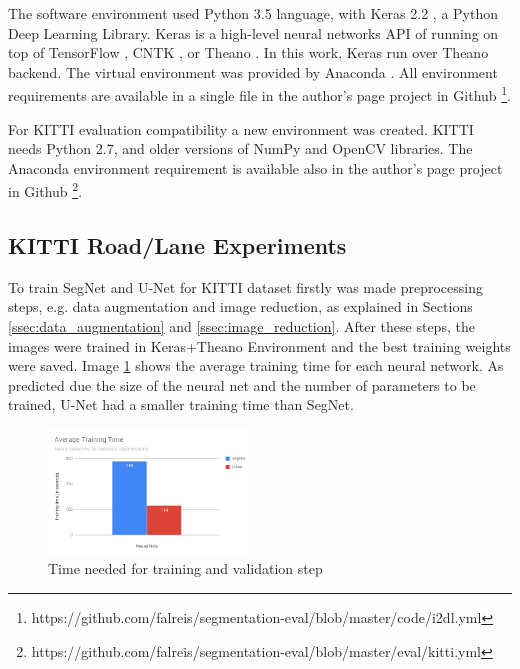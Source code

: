 \documentclass[10pt,twocolumn,letterpaper]{article}
\begin{document}
The software environment used Python 3.5 \cite{PYTHON_WEBSITE} language, with Keras 2.2 \cite{KERAS}, a Python Deep Learning Library. Keras is a high-level neural networks API of running on top of TensorFlow \cite{TENSORFLOW}, CNTK \cite{CNTK}, or Theano \cite{THEANO} \cite{KERAS}. In this work, Keras run over Theano \cite{THEANO} backend. The virtual environment was provided by Anaconda \cite{ANACONDA_WEBSITE}. All environment requirements are available in a single file in the author's page project in Github \footnote{https://github.com/falreis/segmentation-eval/blob/master/code/i2dl.yml}.

For KITTI evaluation compatibility a new environment was created. KITTI needs Python 2.7, and older versions of NumPy and OpenCV libraries. The Anaconda environment requirement is available also in the author's page project in Github \footnote{https://github.com/falreis/segmentation-eval/blob/master/eval/kitti.yml}.

\subsection{KITTI Road/Lane Experiments} \label{ssec:kitti_experiments}

To train SegNet and U-Net for KITTI dataset firstly was made preprocessing steps, e.g. data augmentation and image reduction, as explained in Sections \ref{ssec:data_augmentation} and \ref{ssec:image_reduction}. After these steps, the images were trained in Keras+Theano Environment and the best training weights were saved. Image \ref{fig:training_time} shows the average training time for each neural network. As predicted due the size of the neural net and the number of parameters to be trained, U-Net had a smaller training time than SegNet.

\begin{figure}[ht]
  \centering
  \includegraphics[width=0.48\textwidth]{graph_training_time.png}
  \caption{Time needed for training and validation step}
  \label{fig:training_time}
\end{figure}
\end{document}
